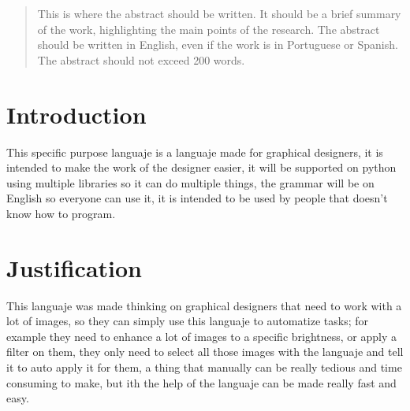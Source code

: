 \begin{abstract} %
    This is where the abstract should be written. It should be a 
    brief summary of the work, highlighting the main points of 
    the research. The abstract should be written in English, even 
    if the work is in Portuguese or Spanish. The abstract should 
    not exceed 200 words.
\end{abstract}
\section{Introduction}
This specific purpose languaje is a languaje made for graphical 
designers, it is intended to make the work of the designer easier, 
it will be supported on python using multiple libraries so it can 
do multiple things, the grammar will be on English so everyone can 
use it, it is intended to be used by people that doesn't know how 
to program.
\section{Justification}
This languaje was made thinking on graphical designers that need 
to work with a lot of images, so they can simply use this languaje 
to automatize tasks; for example they need to enhance a lot of 
images to a specific brightness, or apply a filter on them, they 
only need to select all those images with the languaje and tell it 
to auto apply it for them, a thing that manually can be really 
tedious and time consuming to make, but ith the help of the 
languaje can be made really fast and easy.